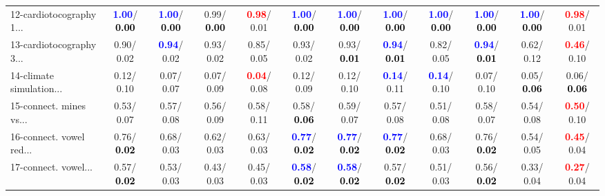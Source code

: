 \begin{table}[h]
\begin{center}
{\begin{tabular}{lc|c|c|c|c|c|c|c|c|c|c}
12-cardiotocography 1... & \textcolor{blue}{\textbf{  1.00}}/\textcolor{black}{\textbf{  0.00}} & \textcolor{blue}{\textbf{  1.00}}/\textcolor{black}{\textbf{  0.00}} &   0.99/\textcolor{black}{\textbf{  0.00}} & \textcolor{red}{\textbf{  0.98}}/  0.01 & \textcolor{blue}{\textbf{  1.00}}/\textcolor{black}{\textbf{  0.00}} & \textcolor{blue}{\textbf{  1.00}}/\textcolor{black}{\textbf{  0.00}} & \textcolor{blue}{\textbf{  1.00}}/\textcolor{black}{\textbf{  0.00}} & \textcolor{blue}{\textbf{  1.00}}/\textcolor{black}{\textbf{  0.00}} & \textcolor{blue}{\textbf{  1.00}}/\textcolor{black}{\textbf{  0.00}} & \textcolor{blue}{\textbf{  1.00}}/\textcolor{black}{\textbf{  0.00}} & \textcolor{red}{\textbf{  0.98}}/  0.01 \\
13-cardiotocography 3... &   0.90/  0.02 & \textcolor{blue}{\textbf{  0.94}}/  0.02 &   0.93/  0.02 &   0.85/  0.05 &   0.93/  0.02 &   0.93/\textcolor{black}{\textbf{  0.01}} & \textcolor{blue}{\textbf{  0.94}}/\textcolor{black}{\textbf{  0.01}} &   0.82/  0.05 & \textcolor{blue}{\textbf{  0.94}}/\textcolor{black}{\textbf{  0.01}} &   0.62/  0.12 & \textcolor{red}{\textbf{  0.46}}/  0.10 \\
14-climate simulation... &   0.12/  0.10 &   0.07/  0.07 &   0.07/  0.09 & \textcolor{red}{\textbf{  0.04}}/  0.08 &   0.12/  0.09 &   0.12/  0.10 & \textcolor{blue}{\textbf{  0.14}}/  0.11 & \textcolor{blue}{\textbf{  0.14}}/  0.10 &   0.07/  0.10 &   0.05/\textcolor{black}{\textbf{  0.06}} &   0.06/\textcolor{black}{\textbf{  0.06}} \\ \hline
15-connect. mines vs... &   0.53/  0.07 &   0.57/  0.08 &   0.56/  0.09 &   0.58/  0.11 &   0.58/\textcolor{black}{\textbf{  0.06}} &   0.59/  0.07 &   0.57/  0.08 &   0.51/  0.08 &   0.58/  0.07 &   0.54/  0.08 & \textcolor{red}{\textbf{  0.50}}/  0.10 \\
16-connect. vowel red... &   0.76/\textcolor{black}{\textbf{  0.02}} &   0.68/  0.03 &   0.62/  0.03 &   0.63/  0.03 & \textcolor{blue}{\textbf{  0.77}}/\textcolor{black}{\textbf{  0.02}} & \textcolor{blue}{\textbf{  0.77}}/\textcolor{black}{\textbf{  0.02}} & \textcolor{blue}{\textbf{  0.77}}/\textcolor{black}{\textbf{  0.02}} &   0.68/  0.03 &   0.76/\textcolor{black}{\textbf{  0.02}} &   0.54/  0.05 & \textcolor{red}{\textbf{  0.45}}/  0.04 \\
17-connect. vowel... &   0.57/\textcolor{black}{\textbf{  0.02}} &   0.53/  0.03 &   0.43/  0.03 &   0.45/  0.03 & \textcolor{blue}{\textbf{  0.58}}/\textcolor{black}{\textbf{  0.02}} & \textcolor{blue}{\textbf{  0.58}}/\textcolor{black}{\textbf{  0.02}} &   0.57/\textcolor{black}{\textbf{  0.02}} &   0.51/  0.03 &   0.56/\textcolor{black}{\textbf{  0.02}} &   0.33/  0.04 & \textcolor{red}{\textbf{  0.27}}/  0.04 \\

\end{tabular}}
\end{center}
\end{table}

